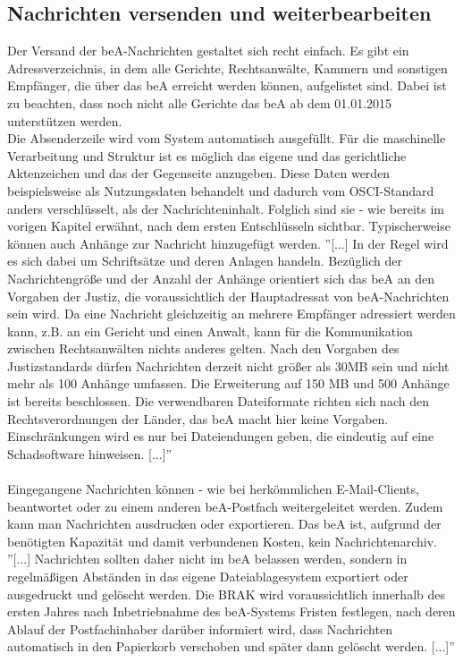 \subsection{Nachrichten versenden und weiterbearbeiten}
Der Versand der beA-Nachrichten gestaltet sich recht einfach. Es gibt ein Adressverzeichnis, in dem alle Gerichte, Rechtsanwälte, Kammern und sonstigen Empfänger, die über das beA erreicht werden können, aufgelistet sind. Dabei ist zu beachten, dass noch nicht alle Gerichte das beA ab dem 01.01.2015 unterstützen werden. \\
Die Absenderzeile wird vom System automatisch ausgefüllt. Für die maschinelle Verarbeitung und Struktur ist es möglich das eigene und das gerichtliche Aktenzeichen und das der Gegenseite anzugeben. Diese Daten werden beispielsweise als Nutzungsdaten behandelt und dadurch vom OSCI-Standard anders verschlüsselt, als der Nachrichteninhalt. Folglich sind sie - wie bereits im vorigen Kapitel erwähnt, nach dem ersten Entschlüsseln sichtbar. Typischerweise können auch Anhänge zur Nachricht hinzugefügt werden. ''[...] In der Regel wird es sich dabei um Schriftsätze und deren Anlagen handeln. Bezüglich der Nachrichtengröße und der Anzahl der Anhänge orientiert sich das beA an den Vorgaben der Justiz, die voraussichtlich der Hauptadressat von beA-Nachrichten sein wird. Da eine Nachricht gleichzeitig an mehrere Empfänger adressiert werden kann, z.B. an ein Gericht und einen Anwalt, kann für die Kommunikation zwischen Rechtsanwälten nichts anderes gelten. Nach den Vorgaben des Justizstandards dürfen Nachrichten derzeit nicht größer als 30MB sein und nicht mehr als 100 Anhänge umfassen. Die Erweiterung auf 150 MB und 500 Anhänge ist bereits beschlossen. Die verwendbaren Dateiformate richten sich nach den Rechtsverordnungen der Länder, das beA macht hier keine Vorgaben. Einschränkungen wird es nur bei Dateiendungen geben, die eindeutig auf eine Schadsoftware hinweisen. [...]''\textcite{bea:bea:brak3/2015} \\
\\
Eingegangene Nachrichten können - wie bei herkömmlichen E-Mail-Clients, beantwortet oder zu einem anderen beA-Postfach weitergeleitet werden. Zudem kann man Nachrichten ausdrucken oder exportieren. Das beA ist, aufgrund der benötigten Kapazität und damit verbundenen Kosten, kein Nachrichtenarchiv. ''[...] Nachrichten sollten daher nicht im beA belassen werden, sondern in regelmäßigen Abständen in das eigene Dateiablagesystem exportiert oder ausgedruckt und gelöscht werden. Die BRAK wird voraussichtlich innerhalb des ersten Jahres nach Inbetriebnahme des beA-Systems Fristen festlegen, nach deren Ablauf der Postfachinhaber darüber informiert wird, dass Nachrichten automatisch in den Papierkorb verschoben und später dann gelöscht werden. [...]''\textcite{bea:bea:brak3/2015}

